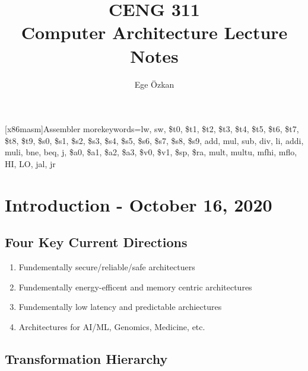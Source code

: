 \documentclass[11pt,a4paper,twocolumn]{book}
\author{Ege Özkan}
\title{CENG 311 \\ \large{Computer Architecture Lecture Notes}}
\begin{document}
\newcommand{\code}[1]{\texttt{#1}}
\newcommand{\cputime}{\ensuremath{\text{CPU Time}}}
\newcommand{\cyclecount}{\text{Cycle Count}}
\newcommand{\cycletime}{\text{Cycle Time}}
\newcommand{\clockrate}{\text{Clock Rate}}

\newcommand{\C}[1]{\code{#1}}

\newcommand{\rs}[1]{\code{\$s#1}} %
\newcommand{\rt}[1]{\code{\$t#1}} %
\newcommand{\Rs}[1]{\code{\$s#1}}
\newcommand{\Rt}[1]{\code{\$t#1}}
\newcommand{\Ra}[1]{\code{\$a#1}}
\newcommand{\Rv}[1]{\code{\$v#1}}
\newcommand{\Rra}{\code{\$ra}}
\newcommand{\Rsp}{\code{\$sp}}
\maketitle
\newcommand{\inscount}{\text{IC}}
\newcommand{\missed}{\textit{!*}}
   [x86masm]{Assembler} %
   {morekeywords={lw, sw, \$t0, \$t1,
   \$t2, \$t3, \$t4, \$t5, \$t6, \$t7,
   \$t8, \$t9, \$s0, \$s1, \$s2, \$s3,
   \$s4, \$s5, \$s6, \$s7, \$s8, \$s9,
   add, mul, sub, div,
   li, addi, muli, bne, beq, j,
   \$a0, \$a1, \$a2, \$a3, \$v0, \$v1,
   \$sp, \$ra, mult, multu, mfhi, mflo, HI, LO, jal, jr}} %


\lstset{language=[MISP]Assembler}

\chapter{Introduction - October 16, 2020}

\section{Four Key Current Directions}

\begin{enumerate}
\item Fundementally secure/reliable/safe architectuers
\item Fundementally energy-efficent and memory centric architectures
\item Fundementally low latency and predictable archiectures
\item Architectures for AI/ML, Genomics, Medicine, etc.
\end{enumerate}

\section{Transformation Hierarchy}
\end{document}

